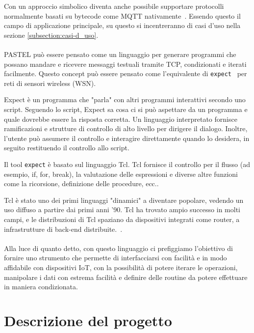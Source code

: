 \documentclass[10pt]{article}
\begin{document}
Con un approccio simbolico diventa anche possibile supportare protocolli normalmente basati su bytecode come MQTT nativamente~\cite{gaglio19interoperable}.
Essendo questo il campo di applicazione principale, su questo si incentreranno di casi d'uso nella sezione \ref{subsection:casi-d_uso}.\\\\



PASTEL può essere pensato come un linguaggio per generare programmi che possano mandare e ricevere messaggi testuali tramite TCP, condizionati e iterati facilmente. Questo concept può essere pensato come l'equivalente di \texttt{expect}~\cite{libes1991expect, libes1990expect, libes1995exploring} per reti di sensori wireless (WSN).

Expect è un programma che "parla" con altri programmi interattivi secondo uno script. Seguendo lo script, Expect sa cosa ci si può aspettare da un programma e quale dovrebbe essere la risposta corretta. Un linguaggio interpretato fornisce ramificazioni e strutture di controllo di alto livello per dirigere il dialogo. Inoltre, l'utente può assumere il controllo e interagire direttamente quando lo desidera, in seguito restituendo il controllo allo script.

Il tool \texttt{expect} è basato sul linguaggio Tcl. Tcl fornisce il controllo per il flusso (ad esempio, if, for, break), la valutazione delle espressioni e diverse altre funzioni come la ricorsione, definizione delle procedure, ecc.. 

Tcl è stato uno dei primi linguaggi "dinamici" a diventare popolare, vedendo un uso diffuso a partire dai primi anni '90. Tcl ha trovato ampio successo in molti campi, e le distribuzioni di Tcl spaziano da dispositivi integrati come router, a infrastrutture di back-end distribuite.~\cite{nadkarni2017tcl}.\\\\

Alla luce di quanto detto, con questo linguaggio ci prefiggiamo l'obiettivo di fornire uno strumento che permette di interfacciarsi con facilità e in modo affidabile con dispositivi IoT, con la possibilità di potere iterare le operazioni, manipolare i dati con estrema facilità e definire delle routine da potere effettuare in maniera condizionata.



\section{Descrizione del progetto}\label{section:descrizione}
\end{document}
